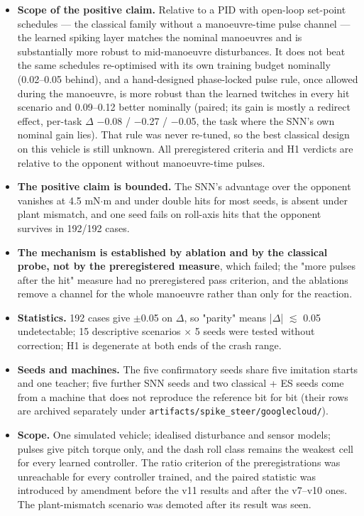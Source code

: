 \documentclass[10pt,a4paper]{article}
\begin{document}
\begin{itemize}\setlength\itemsep{2pt}
\item \textbf{Scope of the positive claim.} Relative to a PID with open-loop set-point schedules --- the classical family without a manoeuvre-time pulse channel --- the learned spiking layer matches the nominal manoeuvres and is substantially more robust to mid-manoeuvre disturbances. It does not beat the same schedules re-optimised with its own training budget nominally (0.02--0.05 behind), and a hand-designed phase-locked pulse rule, once allowed during the manoeuvre, is more robust than the learned twitches in every hit scenario and 0.09--0.12 better nominally (paired; its gain is mostly a redirect effect, per-task $\Delta$ $-$0.08 / $-$0.27 / $-$0.05, the task where the SNN's own nominal gain lies). That rule was never re-tuned, so the best classical design on this vehicle is still unknown. All preregistered criteria and H1 verdicts are relative to the opponent without manoeuvre-time pulses.
\item \textbf{The positive claim is bounded.} The SNN's advantage over the opponent vanishes at 4.5 mN$\cdot$m and under double hits for most seeds, is absent under plant mismatch, and one seed fails on roll-axis hits that the opponent survives in 192/192 cases.
\item \textbf{The mechanism is established by ablation and by the classical probe, not by the preregistered measure}, which failed; the "more pulses after the hit" measure had no preregistered pass criterion, and the ablations remove a channel for the whole manoeuvre rather than only for the reaction.
\item \textbf{Statistics.} 192 cases give $\pm$0.05 on $\Delta$, so "parity" means |$\Delta$| $\lesssim$ 0.05 undetectable; 15 descriptive scenarios $\times$ 5 seeds were tested without correction; H1 is degenerate at both ends of the crash range.
\item \textbf{Seeds and machines.} The five confirmatory seeds share five imitation starts and one teacher; five further SNN seeds and two classical + ES seeds come from a machine that does not reproduce the reference bit for bit (their rows are archived separately under \texttt{artifacts/spike\_steer/googlecloud/}).
\item \textbf{Scope.} One simulated vehicle; idealised disturbance and sensor models; pulses give pitch torque only, and the dash roll class remains the weakest cell for every learned controller. The ratio criterion of the preregistrations was unreachable for every controller trained, and the paired statistic was introduced by amendment before the v11 results and after the v7--v10 ones. The plant-mismatch scenario was demoted after its result was seen.
\end{itemize}
\end{document}
